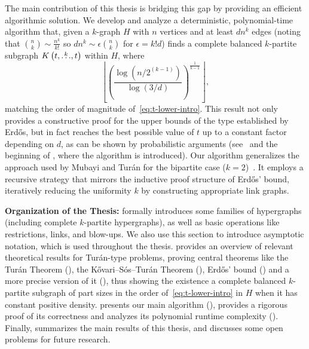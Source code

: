 The main contribution of this thesis is bridging this gap by providing an efficient algorithmic solution.
We develop and analyze a deterministic, polynomial-time algorithm that,
given a $k$-graph $H$ with $n$ vertices and at least $dn^k$ edges (noting that $\binom{n}{k} \sim \frac{n^k}{k!}$
so $dn^k \sim \epsilon \binom{n}{k}$ for $\epsilon = k! d$)
finds a complete balanced $k$-partite subgraph $K\left(t, \overset{k}{\dots}, t\right)$ within $H$, where
\[
    \left\lfloor \left(  \frac{\log \left(n/2^{(k-1)}\right)}{\log (3/d)} \right)^{\frac{1}{k-1}} \right\rfloor,
\]
matching the order of magnitude of~\eqref{eq:t-lower-intro}.
This result not only provides a constructive proof for the upper bounds of the type established by Erdős,
but in fact reaches the best possible value of $t$ up to a constant factor depending on $d$, as
can be shown by probabilistic arguments (see~ and
the beginning of , where the algorithm is introduced).
Our algorithm generalizes the approach used by Mubayi and Turán for the bipartite case ($k=2$)~\cite{MUBAYI2010174}.
It employs a recursive strategy that mirrors the inductive proof structure of Erdős' bound,
iteratively reducing the uniformity $k$ by constructing appropriate link graphs.

\textbf{Organization of the Thesis:}
 formally introduces some families of hypergraphs
(including complete $k$-partite hypergraphs),
as well as basic operations like restrictions, links, and blow-ups.
We also use this section to introduce asymptotic notation, which is used throughout the thesis.
 provides an overview of relevant theoretical results for Turán-type problems,
proving central theorems like the Turán Theorem (), the Kővari--Sós--Turán Theorem (),
Erdős' bound () and a more precise version of it (),
thus showing the existence a complete balanced $k$-partite subgraph of part sizes in the order of~\eqref{eq:t-lower-intro}
in $H$ when it has constant positive density.
 presents our main algorithm (),
provides a rigorous proof of its correctness and analyzes its polynomial runtime complexity ().
Finally,  summarizes the main results of this thesis, and discusses some open problems for future research.
